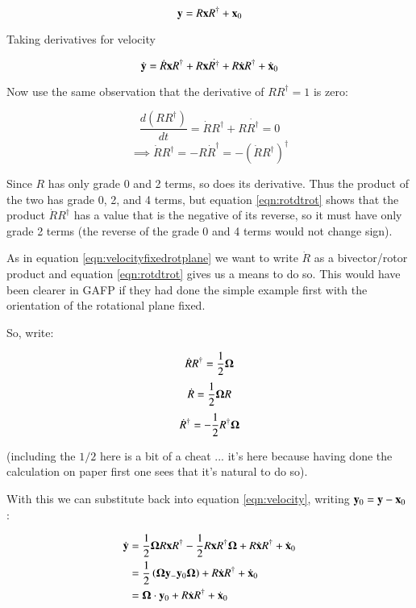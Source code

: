 \documentclass{article}      %
\newcommand{\dt}[1]{\dot{#1}}
\newcommand{\BOmega}[0]{\boldsymbol{\Omega}}
\begin{document}
\[
\mathbf{y} = R \mathbf{x} R^\dagger + \mathbf{x}_0
\]

Taking derivatives for velocity

\begin{equation}\label{eqn:velocity}
\dt{\By} = \dt{R} \Bx R^\dagger +R \Bx \dt{R^\dagger} +R \dt{\Bx} R^\dagger + \dt{\Bx}_0
\end{equation}

Now use the same observation that the derivative of $R R^\dagger = 1$ is zero:

\begin{equation*}
\frac{d (R R^\dagger)}{dt} = \dt{R}R^\dagger + R \dt{R^\dagger} = 0
\end{equation*}
\begin{equation}\label{eqn:rotdtrot}
\implies
\dt{R}R^\dagger = 
 - R \dt{R}^\dagger = -{\left( \dt{R} R^\dagger \right)}^\dagger
\end{equation}

Since $R$ has only grade 0 and 2 terms, so does its derivative.  Thus the product of the two has grade 0, 2, and 4 terms, but 
equation \ref{eqn:rotdtrot} shows that the product $\dt{R} R^\dagger$ has a value that is the negative of its reverse, so it must have
only grade 2 terms (the reverse of the grade 0 and 4 terms would not change sign).

As in equation \ref{eqn:velocityfixedrotplane} we want to write $\dt{R}$ as a bivector/rotor product and equation \ref{eqn:rotdtrot} gives us a means to do so.
This would have been clearer in GAFP if they had done the simple example first with the orientation of the rotational plane fixed.

So, write:

\[
\dt{R}R^\dagger = \inv{2}\BOmega
\]
\[
\dt{R} = \inv{2}\BOmega R
\]
\[
\dt{R}^\dagger = - \inv{2} R^\dagger \BOmega
\]

(including the $1/2$ here is a bit of a cheat ... it's here because having done the calculation on paper first one sees that it's natural to do so).

With this we can substitute back into equation \ref{eqn:velocity}, writing $\mathbf{y}_0 = \mathbf{y} - \mathbf{x}_0$ :

\begin{align*}
\dt{\By}
&= \inv{2} \BOmega {R} \Bx R^\dagger - \inv{2} R \Bx {R^\dagger} \BOmega +R \dt{\Bx} R^\dagger + \dt{\Bx}_0 \\
&= \inv{2}\left(\BOmega \By_ - \By_0 \BOmega\right) +R \dt{\Bx} R^\dagger + \dt{\Bx}_0 \\
&= \BOmega \cdot \By_0 +R \dt{\Bx} R^\dagger + \dt{\Bx}_0 \\
\end{align*}
\end{document}
